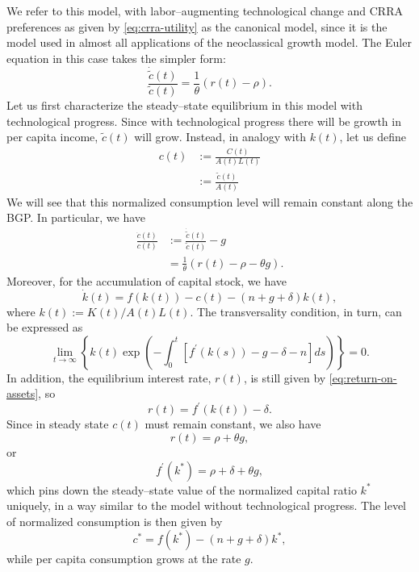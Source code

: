 \documentclass[\topdir/lecture\_notes.tex]{subfiles}
\begin{document}
We refer to this model, with labor--augmenting technological change and CRRA preferences as given by \eqref{eq:crra-utility} as the canonical model, since it is the model used in almost all applications of the neoclassical growth model. The Euler equation in this case takes the simpler form:
\begin{equation}
  \frac{\dot{\tilde{c}}(t)}{\tilde{c}(t)}=\frac{1}{\theta}(r(t)-\rho).
  \label{eq:crra-euler}
\end{equation}
Let us first characterize the steady--state equilibrium in this model with technological progress. Since with technological progress there will be growth in per capita income, $\tilde{c}(t)$ will grow. Instead, in analogy with $k(t)$, let us define
\[
  \begin{aligned}
    c(t) & := \frac{C(t)}{A(t) L(t)}    \\
         & := \frac{\tilde{c}(t)}{A(t)}
  \end{aligned}
\]
We will see that this normalized consumption level will remain constant along the BGP. In particular, we have
\[
  \begin{aligned}
    \frac{\dot{c}(t)}{c(t)} & := \frac{\dot{\tilde{c}}(t)}{\tilde{c}(t)}-g \\
                            & =\frac{1}{\theta}(r(t)-\rho-\theta g).
  \end{aligned}
\]
Moreover, for the accumulation of capital stock, we have
\[
  \dot{k}(t)=f(k(t))-c(t)-(n+g+\delta) k(t),
\]
where $k(t) := K(t) / A(t) L(t)$. The transversality condition, in turn, can be expressed as
\begin{equation}
  \lim _{t \rightarrow \infty}\left\{k(t) \exp \left(-\int_{0}^{t}\left[f^{\prime}(k(s))-g-\delta-n\right] d s\right)\right\}=0.
  \label{eq:transversality-growth}
\end{equation}
In addition, the equilibrium interest rate, $r(t)$, is still given by \eqref{eq:return-on-assets}, so
\[
  r(t)=f^{\prime}(k(t))-\delta.
\]
Since in steady state $c(t)$ must remain constant, we also have
\[
  r(t)=\rho+\theta g,
\]
or
\begin{equation}
  f^{\prime}\left(k^{*}\right)=\rho+\delta+\theta g,
  \label{eq:steady--state-k}
\end{equation}
which pins down the steady--state value of the normalized capital ratio $k^{*}$ uniquely, in a way similar to the model without technological progress. The level of normalized consumption is then given by
\[
  c^{*}=f\left(k^{*}\right)-(n+g+\delta) k^{*},
\]
while per capita consumption grows at the rate $g$.
\end{document}
